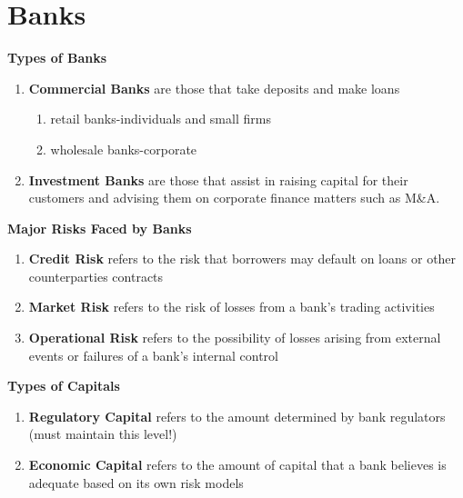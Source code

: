 \documentclass[11pt,fleqn]{report} %
\numberwithin{equation}{section} %
\numberwithin{figure}{section} %
\numberwithin{table}{section} %
\begin{document}
\chapter{Banks}
\begin{definition}\textbf{Types of Banks}
\begin{enumerate}
    \item \textbf{Commercial Banks} are those that take deposits and make loans
    \begin{enumerate}
        \item retail banks-individuals and small firms
        \item wholesale banks-corporate
    \end{enumerate}
    \item \textbf{Investment Banks} are those that assist in raising capital for their customers and advising them on corporate finance matters such as M\&A.
\end{enumerate}
\end{definition}
\begin{definition}\textbf{Major Risks Faced by Banks}
\begin{enumerate}
    \item \textbf{Credit Risk} refers to the risk that borrowers may default on loans or other counterparties contracts
    \item \textbf{Market Risk} refers to the risk of losses from a bank's trading activities
    \item \textbf{Operational Risk} refers to the possibility of losses arising from external events or failures of a bank's internal control
\end{enumerate}
\end{definition}
\begin{definition}\textbf{Types of Capitals}
\begin{enumerate}
    \item \textbf{Regulatory Capital} refers to the amount determined by bank regulators (must maintain this level!)
    \item \textbf{Economic Capital} refers to the amount of capital that a bank believes is adequate based on its own risk models
\end{enumerate}
\end{definition}
\end{document}
